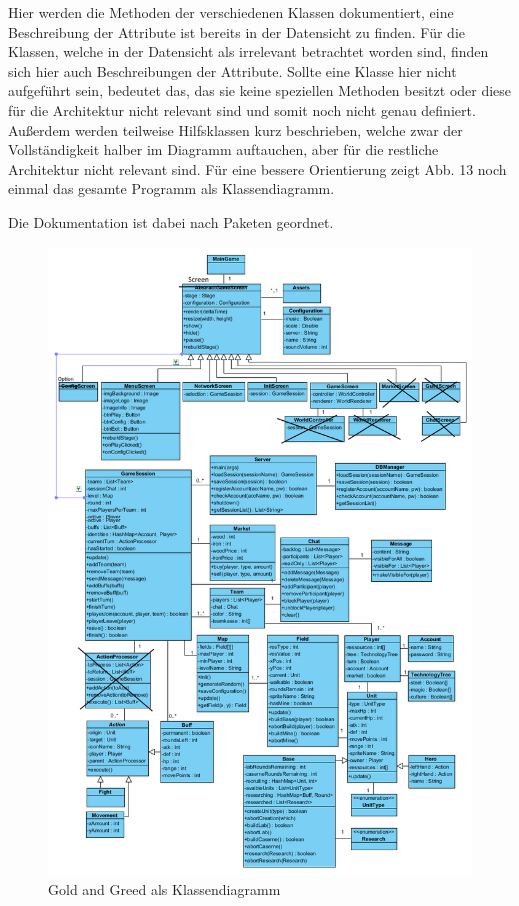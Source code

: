\documentclass[fontsize=12pt,paper=a4,twoside]{scrartcl}
\begin{document}
\label{sec:dokumentation}

Hier werden die Methoden der verschiedenen Klassen dokumentiert, eine Beschreibung der Attribute ist bereits in der Datensicht zu finden. Für die Klassen, welche in der Datensicht als irrelevant betrachtet worden sind, finden sich hier auch Beschreibungen der Attribute. Sollte eine Klasse hier nicht aufgeführt sein, bedeutet das, das sie keine speziellen Methoden besitzt oder diese für die Architektur nicht relevant sind und somit noch nicht genau definiert. Außerdem werden teilweise Hilfsklassen kurz beschrieben, welche zwar der Vollständigkeit halber im Diagramm auftauchen, aber für die restliche Architektur nicht relevant sind. Für eine bessere Orientierung zeigt Abb. 13 noch einmal das gesamte Programm als Klassendiagramm.

Die Dokumentation ist dabei nach Paketen geordnet.

\begin{figure}[h]
\centering
\includegraphics[width=1.0\linewidth]{ClassDiagram1}
\caption{Gold and Greed als Klassendiagramm}
\label{fig:ClassDiagram1}
\end{figure}
\end{document}
